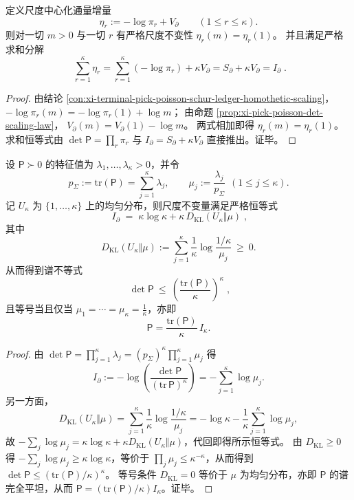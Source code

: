 \begin{conclusion}[尺度中心化账本的严格不变量分解]\label{con:xi-terminal-pick-poisson-centered-ledger-invariants}
定义尺度中心化通量增量
\[
\eta_r:=-\log\pi_r+V_{\partial}\qquad(1\le r\le\kappa).
\]
则对一切 \(m>0\) 与一切 \(r\) 有严格尺度不变性 \(\eta_r(m)=\eta_r(1)\)。
并且满足严格求和分解
\[
\boxed{\;
\sum_{r=1}^{\kappa}\eta_r
=\sum_{r=1}^{\kappa}(-\log\pi_r)+\kappa V_{\partial}
=S_{\partial}+\kappa V_{\partial}
=I_{\partial}\; } .
\]
\end{conclusion}
\begin{proof}
由结论 \ref{con:xi-terminal-pick-poisson-schur-ledger-homothetic-scaling}，
\(
-\log\pi_r(m)=-\log\pi_r(1)+\log m
\)；
由命题 \ref{prop:xi-pick-poisson-det-scaling-law}，
\(
V_{\partial}(m)=V_{\partial}(1)-\log m
\)。
两式相加即得 \(\eta_r(m)=\eta_r(1)\)。
求和恒等式由 \(\det\mathsf P=\prod_r\pi_r\) 与 \(I_{\partial}=S_{\partial}+\kappa V_{\partial}\) 直接推出。证毕。
\end{proof}

\begin{conclusion}\label{con:xi-terminal-pick-poisson-scale-invariant-spectral-kl}
设 \(\mathsf P\succ 0\) 的特征值为 \(\lambda_1,\dots,\lambda_\kappa>0\)，并令
\[
p_\Sigma:=\mathrm{tr}(\mathsf P)=\sum_{j=1}^{\kappa}\lambda_j,
\qquad
\mu_j:=\frac{\lambda_j}{p_\Sigma}\ \ (1\le j\le\kappa).
\]
记 \(U_\kappa\) 为 \(\{1,\dots,\kappa\}\) 上的均匀分布，则尺度不变量满足严格恒等式
\[
\boxed{\;
I_{\partial}
\;=\;
\kappa\log\kappa+\kappa\,D_{\mathrm{KL}}(U_\kappa\Vert \mu)\; } ,
\]
其中
\[
D_{\mathrm{KL}}(U_\kappa\Vert \mu)
:=\sum_{j=1}^{\kappa}\frac1\kappa\log\frac{1/\kappa}{\mu_j}\ \ge\ 0.
\]
从而得到谱不等式
\[
\boxed{\;
\det\mathsf P\ \le\ \left(\frac{\mathrm{tr}(\mathsf P)}{\kappa}\right)^{\kappa}\; } ,
\]
且等号当且仅当 \(\mu_1=\cdots=\mu_\kappa=\frac1\kappa\)，亦即
\[
\mathsf P=\frac{\mathrm{tr}(\mathsf P)}{\kappa}\,I_\kappa .
\]
\end{conclusion}
\begin{proof}
由 \(\det\mathsf P=\prod_{j=1}^{\kappa}\lambda_j=(p_\Sigma)^\kappa\prod_{j=1}^{\kappa}\mu_j\) 得
\[
I_{\partial}
:=-\log\!\left(\frac{\det\mathsf P}{(\mathrm{tr}\,\mathsf P)^{\kappa}}\right)
=-\sum_{j=1}^{\kappa}\log\mu_j.
\]
另一方面，
\[
D_{\mathrm{KL}}(U_\kappa\Vert \mu)
=\sum_{j=1}^{\kappa}\frac1\kappa\log\frac{1/\kappa}{\mu_j}
=-\log\kappa-\frac1\kappa\sum_{j=1}^{\kappa}\log\mu_j,
\]
故 \(-\sum_j\log\mu_j=\kappa\log\kappa+\kappa D_{\mathrm{KL}}(U_\kappa\Vert \mu)\)，代回即得所示恒等式。
由 \(D_{\mathrm{KL}}\ge 0\) 得 \(-\sum_j\log\mu_j\ge \kappa\log\kappa\)，等价于 \(\prod_j\mu_j\le \kappa^{-\kappa}\)，从而得到 \(\det\mathsf P\le (\mathrm{tr}(\mathsf P)/\kappa)^\kappa\)。
等号条件 \(D_{\mathrm{KL}}=0\) 等价于 \(\mu\) 为均匀分布，亦即 \(\mathsf P\) 的谱完全平坦，从而 \(\mathsf P=(\mathrm{tr}(\mathsf P)/\kappa)I_\kappa\)。证毕。
\end{proof}


